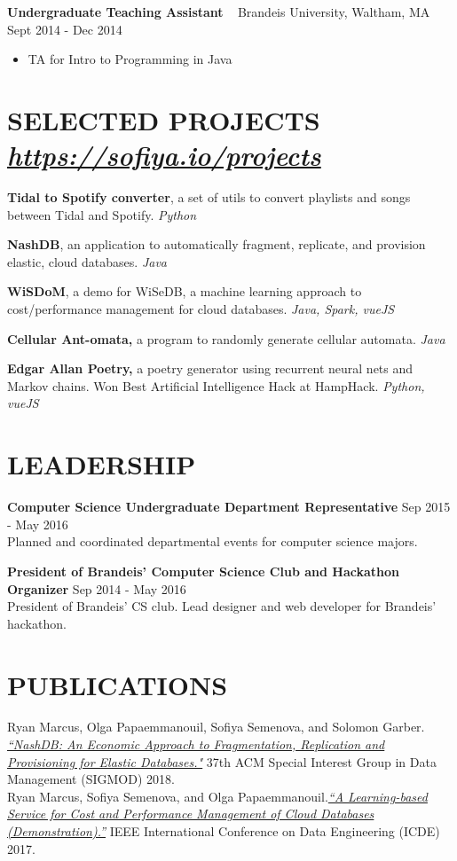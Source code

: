 \documentclass{res}
\begin{document}
\begin{resume}
\textbf{Undergraduate Teaching Assistant} ~ Brandeis University, Waltham, MA \hfill Sept 2014 - Dec 2014 \\ 
	\begin{itemize}  \itemsep -2pt %
	\item TA for Intro to Programming in Java
	\end{itemize}


\section{SELECTED PROJECTS ~  {\sl \href{https://sofiya.io/projects}{https://sofiya.io/projects}}}

\textbf{Tidal to Spotify converter}, a set of utils to convert playlists and songs between Tidal and Spotify.  {\sl Python} 

\textbf{NashDB}, an application to automatically fragment, replicate, and provision elastic, cloud databases. {\sl Java }

\textbf{WiSDoM}, a demo for WiSeDB, a machine learning approach to cost/performance management for cloud  databases. {\sl Java, Spark, vueJS}
	
\textbf{Cellular Ant-omata,} a program to randomly generate cellular automata. {\sl Java}
	
\textbf{Edgar Allan Poetry,} a poetry generator using recurrent neural nets and Markov chains. Won Best  Artificial Intelligence Hack at HampHack. {\sl Python, vueJS}

\section{LEADERSHIP}  

\textbf{Computer Science Undergraduate Department Representative} \hfill Sep 2015 - May 2016 \\
	Planned and coordinated departmental events for computer science majors.	

\textbf{President of Brandeis' Computer Science Club and Hackathon Organizer} \hfill Sep 2014 - May 2016 \\
	President of Brandeis' CS club. Lead designer and web developer for Brandeis' hackathon.
	
\section{PUBLICATIONS}             
	 Ryan Marcus, Olga Papaemmanouil, Sofiya Semenova, and Solomon Garber. \href{https://api.zotero.org/users/3604318/publications/items/35KTECTC/file/view}{\sl “NashDB: An Economic Approach to Fragmentation, Replication and Provisioning for Elastic Databases."} 37th ACM Special Interest Group in Data Management (SIGMOD) 2018. \\
	  Ryan Marcus, Sofiya Semenova, and Olga Papaemmanouil.\href{http://www.cs.brandeis.edu/~olga/publications/icde17-demo.pdf}{\sl “A Learning-based Service for Cost and Performance Management of Cloud Databases (Demonstration).”} IEEE International Conference on Data Engineering (ICDE) 2017.


\end{resume}
\end{document}
